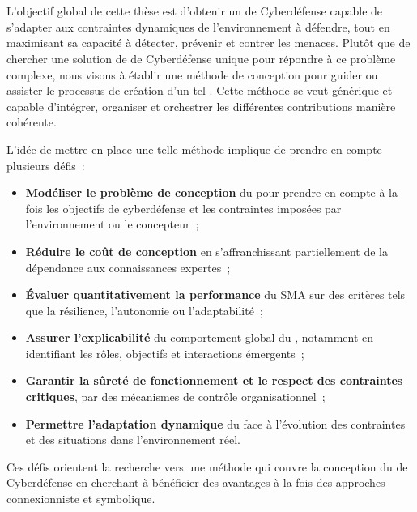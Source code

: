 \

\bigskip

\\

\noindent
L'objectif global de cette thèse est d'obtenir un  de Cyberdéfense capable de s'adapter aux contraintes dynamiques de l'environnement à défendre, tout en maximisant sa capacité à détecter, prévenir et contrer les menaces.
%
Plutôt que de chercher une solution de  de Cyberdéfense unique pour répondre à ce problème complexe, nous visons à établir une méthode de conception pour guider ou assister le processus de création d'un tel . Cette méthode se veut générique et capable d'intégrer, organiser et orchestrer les différentes contributions manière cohérente.

\noindent
L'idée de mettre en place une telle méthode implique de prendre en compte plusieurs défis~:
\begin{itemize}
  \item \textbf{Modéliser le problème de conception} du  pour prendre en compte à la fois les objectifs de cyberdéfense et les contraintes imposées par l'environnement ou le concepteur~;
  \item \textbf{Réduire le coût de conception} en s'affranchissant partiellement de la dépendance aux connaissances expertes~;
  \item \textbf{Évaluer quantitativement la performance} du SMA sur des critères tels que la résilience, l'autonomie ou l'adaptabilité~;
  \item \textbf{Assurer l'explicabilité} du comportement global du , notamment en identifiant les rôles, objectifs et interactions émergents~;
  \item \textbf{Garantir la sûreté de fonctionnement et le respect des contraintes critiques}, par des mécanismes de contrôle organisationnel~;
  \item \textbf{Permettre l'adaptation dynamique} du  face à l'évolution des contraintes et des situations dans l'environnement réel.
\end{itemize}

\noindent
Ces défis orientent la recherche vers une méthode qui couvre la conception du  de Cyberdéfense en cherchant à bénéficier des avantages à la fois des approches connexionniste et symbolique.

\

\bigskip

\\

